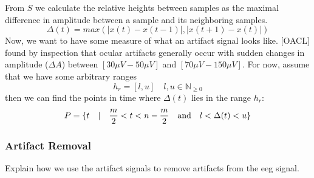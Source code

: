 From $S$ we calculate the relative heights between samples as the maximal difference in amplitude between a sample and its neighboring samples.
\begin{equation}
\label{eq:relheights}
\Delta (t) = max(|x(t)-x(t-1)|,|x(t+1) - x(t)|)
\end{equation}
Now, we want to have some measure of what an artifact signal looks like. [OACL] found by inspection that ocular artifacts generally occur with sudden changes in amplitude ($\Delta A$) between $[30\mu V-50\mu V]$ and $[70\mu V-150\mu V]$. For now, assume that we have some arbitrary ranges
\begin{equation}
\label{eq:ranges}
h_r=[l, u] \quad  l,u \in \mathbb{N}_{\geq 0}
\end{equation}
then we can find the points in time where $\Delta (t)$  lies in the range $h_r$:
\begin{equation}
\label{eq:peaks}
P = \{t \quad | \quad \frac{m}{2} < t < n-\frac{m}{2} \quad \textnormal{and} \quad l < \Delta (t) < u\}
\end{equation}
\subsubsection{Artifact Removal}
Explain how we use the artifact signals to remove artifacts from the eeg signal.